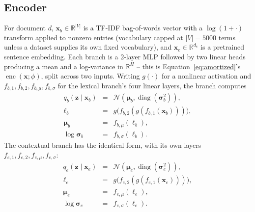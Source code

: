 \documentclass[11pt]{article}
\begin{document}
\subsection{Encoder}
\label{sec:encoder}

For document $d$, $\mathbf{x}_b \in \mathbb{R}^{|V|}$ is a TF-IDF bag-of-words vector with a $\log(1+\cdot)$ transform applied to nonzero entries (vocabulary capped at $|V|=5000$ terms unless a dataset supplies its own fixed vocabulary), and $\mathbf{x}_e \in \mathbb{R}^{d_e}$ is a pretrained sentence embedding. Each branch is a 2-layer MLP followed by two linear heads producing a mean and a log-variance in $\mathbb{R}^{H}$ -- this is Equation~\ref{eq:amortized}'s $\operatorname{enc}(\mathbf{x};\phi)$, split across two inputs. Writing $g(\cdot)$ for a nonlinear activation and $f_{b,1},f_{b,2},f_{b,\mu},f_{b,\sigma}$ for the lexical branch's four linear layers, the branch computes
\begin{eqnarray}
q_b(\mathbf{z}\mid\mathbf{x}_b) &=& \mathcal{N}\!\left(\boldsymbol{\mu}_b,\operatorname{diag}(\boldsymbol{\sigma}_b^2)\right), \label{eq:lexical-posterior}\\
\boldsymbol{\ell}_b &=& g\big(f_{b,2}(g(f_{b,1}(\mathbf{x}_b)))\big), \nonumber\\
\boldsymbol{\mu}_b &=& f_{b,\mu}(\boldsymbol{\ell}_b), \nonumber\\
\log\boldsymbol{\sigma}_b &=& f_{b,\sigma}(\boldsymbol{\ell}_b). \nonumber
\end{eqnarray}
The contextual branch has the identical form, with its own layers $f_{e,1},f_{e,2},f_{e,\mu},f_{e,\sigma}$:
\begin{eqnarray}
q_e(\mathbf{z}\mid\mathbf{x}_e) &=& \mathcal{N}\!\left(\boldsymbol{\mu}_e,\operatorname{diag}(\boldsymbol{\sigma}_e^2)\right), \label{eq:contextual-posterior}\\
\boldsymbol{\ell}_e &=& g\big(f_{e,2}(g(f_{e,1}(\mathbf{x}_e)))\big), \nonumber\\
\boldsymbol{\mu}_e &=& f_{e,\mu}(\boldsymbol{\ell}_e), \nonumber\\
\log\boldsymbol{\sigma}_e &=& f_{e,\sigma}(\boldsymbol{\ell}_e). \nonumber
\end{eqnarray}
\end{document}
